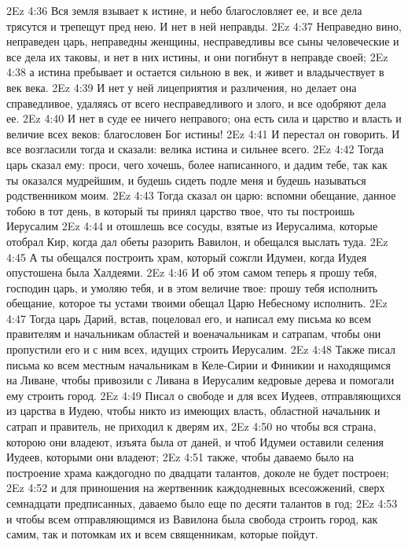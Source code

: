 \vs 2Ez 4:36 Вся земля взывает к истине, и небо благословляет ее, и все дела трясутся и трепещут пред нею. И нет в ней неправды.
\vs 2Ez 4:37 Неправедно вино, неправеден царь, неправедны женщины, несправедливы все сыны человеческие и все дела их таковы, и нет в них истины, и они погибнут в неправде своей;
\vs 2Ez 4:38 а истина пребывает и остается сильною в век, и живет и владычествует в век века.
\vs 2Ez 4:39 И нет у ней лицеприятия и различения, но делает она справедливое, удаляясь от всего несправедливого и злого, и все одобряют дела ее.
\vs 2Ez 4:40 И нет в суде ее ничего неправого; она есть сила и царство и власть и величие всех веков: благословен Бог истины!
\vs 2Ez 4:41 И перестал он говорить. И все возгласили тогда и сказали: велика истина и сильнее всего.
\rsbpar\vs 2Ez 4:42 Тогда царь сказал ему: проси, чего хочешь, более написанного, и дадим тебе, так как ты оказался мудрейшим, и будешь сидеть подле меня и будешь называться родственником моим.
\vs 2Ez 4:43 Тогда сказал он царю: вспомни обещание, данное тобою в тот день, в который ты принял царство твое, что ты построишь Иерусалим
\vs 2Ez 4:44 и отошлешь все сосуды, взятые из Иерусалима, которые отобрал Кир, когда дал обеты разорить Вавилон, и обещался выслать  туда.
\vs 2Ez 4:45 А ты обещался построить храм, который сожгли Идумеи, когда Иудея опустошена была Халдеями.
\vs 2Ez 4:46 И об этом самом теперь я прошу тебя, господин царь, и умоляю тебя, и в этом величие твое: прошу тебя исполнить обещание, которое ты устами твоими обещал Царю Небесному исполнить.
\rsbpar\vs 2Ez 4:47 Тогда царь Дарий, встав, поцеловал его, и написал ему письма ко всем правителям и начальникам областей и военачальникам и сатрапам, чтобы они пропустили его и с ним всех, идущих строить Иерусалим.
\vs 2Ez 4:48 Также писал письма ко всем местным начальникам в Келе-Сирии и Финикии и находящимся на Ливане, чтобы привозили с Ливана в Иерусалим кедровые дерева и помогали ему строить город.
\vs 2Ez 4:49 Писал о свободе и для всех Иудеев, отправляющихся из царства в Иудею, чтобы никто из имеющих власть, областной начальник и сатрап и правитель, не приходил к дверям их,
\vs 2Ez 4:50 но чтобы вся страна, которою они владеют, изъята была от даней, и чтоб Идумеи оставили селения Иудеев, которыми они владеют;
\vs 2Ez 4:51 также, чтобы даваемо было на построение храма каждогодно по двадцати талантов, доколе не будет построен;
\vs 2Ez 4:52 и для приношения на жертвенник каждодневных всесожжений, сверх семнадцати предписанных, даваемо было еще по десяти талантов в год;
\vs 2Ez 4:53 и чтобы всем отправляющимся из Вавилона была свобода строить город, как самим, так и потомкам их и всем священникам, которые пойдут.

